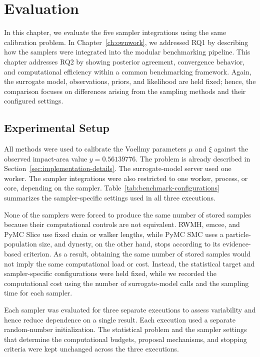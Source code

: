 \chapter{Evaluation}
\label{ch:evaluation}

In this chapter, we evaluate the five sampler integrations using the same calibration problem. In Chapter~\ref{ch:ownwork}, we addressed RQ1 by describing how the samplers were integrated into the modular benchmarking pipeline. This chapter addresses RQ2 by showing posterior agreement, convergence behavior, and computational efficiency within a common benchmarking framework. Again, the surrogate model, observations, priors, and likelihood are held fixed; hence, the comparison focuses on differences arising from the sampling methods and their configured settings.


\section{Experimental Setup}
\label{sec:experimental-setup}

All methods were used to calibrate the Voellmy parameters $\mu$ and $\xi$ against the observed impact-area value $y=0.56139776$. The problem is already described in Section~\ref{sec:implementation-details}. The surrogate-model server used one worker. The sampler integrations were also restricted to one worker, process, or core, depending on the sampler. Table~\ref{tab:benchmark-configurations} summarizes the sampler-specific settings used in all three executions.

None of the samplers were forced to produce the same number of stored samples because their computational controls are not equivalent. RWMH, emcee, and PyMC Slice use fixed chain or walker lengths, while PyMC SMC uses a particle-population size, and dynesty, on the other hand, stops according to its evidence-based criterion. As a result, obtaining the same number of stored samples would not imply the same computational load or cost. Instead, the statistical target and sampler-specific configurations were held fixed, while we recorded the computational cost using the number of surrogate-model calls and the sampling time for each sampler.

Each sampler was evaluated for three separate executions to assess variability and hence reduce dependence on a single result. Each execution used a separate random-number initialization. The statistical problem and the sampler settings that determine the computational budgets, proposal mechanisms, and stopping criteria were kept unchanged across the three executions.

